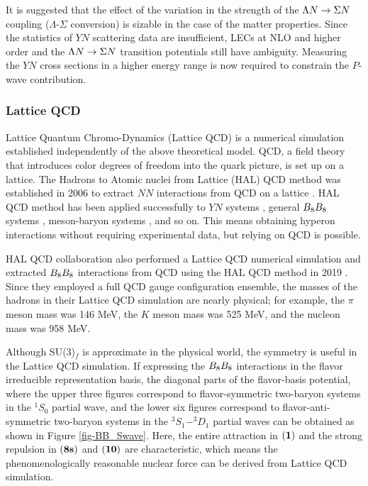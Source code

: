 It is suggested that the effect of the variation in the strength of the $\Lambda N\to\Sigma N$ coupling ($\Lambda$-$\Sigma$ conversion) is sizable in the case of the matter properties. %
Since the statistics of $YN$ scattering data are insufficient, LECs at NLO and higher order and the $\Lambda N\to\Sigma N$ transition potentials still have ambiguity. Measuring the $YN$ cross sections in a higher energy range is now required to constrain the $P$-wave contribution. %

\subsubsection{Lattice QCD}
\label{sec-LatticeQCD}
Lattice Quantum Chromo-Dynamics (Lattice QCD) is a numerical simulation established independently of the above theoretical model. QCD, a field theory that introduces color degrees of freedom into the quark picture, is set up on a lattice. The Hadrons to Atomic nuclei from Lattice (HAL) QCD method was established in 2006 to extract $NN$ interactions from QCD on a lattice \cite{QCD-2006}. HAL QCD method has been applied successfully to $YN$ systems \cite{QCD-YN}, general $B_{8}B_{8}$ systems \cite{QCD-BB}, meson-baryon systems \cite{QCD-MB}, and so on. This means obtaining hyperon interactions without requiring experimental data, but relying on QCD is possible. 

HAL QCD collaboration also performed a Lattice QCD numerical simulation and extracted $B_{8}B_{8}$ interactions from QCD using the HAL QCD method in 2019 \cite{QCD-2019}. Since they employed a full QCD gauge configuration ensemble, the masses of the hadrons in their Lattice QCD simulation are nearly physical; for example, the $\pi$ meson mass was 146 MeV, the $K$ meson mass was 525 MeV, and the nucleon mass was 958 MeV. 

Although SU(3)$_f$ is approximate in the physical world, the symmetry is useful in the Lattice QCD simulation. If expressing the $B_{8}B_{8}$ interactions in the flavor irreducible representation basis, the diagonal parts of the flavor-basis potential, where the upper three figures correspond to flavor-symmetric two-baryon systems in the $^1S_0$ partial wave, and the lower six figures correspond to flavor-anti-symmetric two-baryon systems in the $^3S_1$$-$$^3D_1$ partial waves can be obtained as shown in Figure \ref{fig-BB_Swave}. Here, the entire attraction in ${\bf (1)}$ and the strong repulsion in ${\bf (8s)}$ and ${\bf (10)}$ are characteristic, which means the phenomenologically reasonable nuclear force can be derived from Lattice QCD simulation.


